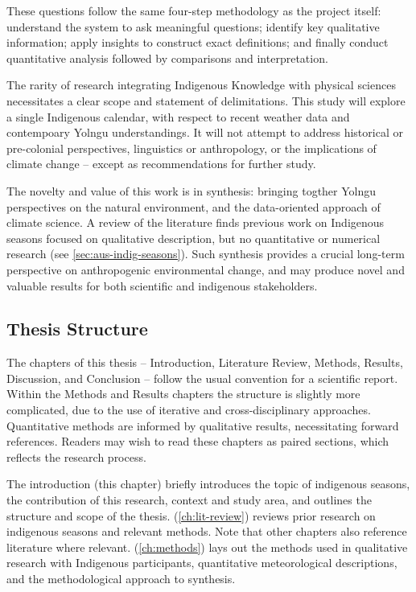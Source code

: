 These questions follow the same four-step methodology as the project itself:
understand the system to ask meaningful questions; identify key
qualitative information; apply insights to construct exact definitions; and
finally conduct quantitative analysis followed by comparisons and interpretation.

The rarity of research integrating Indigenous Knowledge with physical sciences
necessitates a clear scope and statement of delimitations.  This study will
explore a single Indigenous calendar, with respect to recent weather data
and contempoary Yolngu understandings.  It will not attempt to address historical
or pre-colonial perspectives, linguistics or anthropology, or the implications
of climate change -- except as recommendations for further study.

The novelty and value of this work is in synthesis: bringing
togther Yolngu perspectives on the natural environment, and the
data-oriented approach of climate science.  A review of the literature
finds previous work on Indigenous seasons focused on qualitative description, but
no quantitative or numerical research (see \cref{sec:aus-indig-seasons}).
Such synthesis provides a crucial long-term perspective on
anthropogenic environmental change, and may produce novel and valuable
results for both scientific and indigenous stakeholders.



\subsection*{Thesis Structure}

The chapters of this thesis -- Introduction, Literature Review, Methods,
Results, Discussion, and Conclusion -- follow the usual convention for
a scientific report.  Within the Methods and Results chapters
the structure is slightly more complicated, due to the use of iterative and
cross-disciplinary approaches.  Quantitative methods are informed by
qualitative results, necessitating forward references.  Readers may wish
to read these chapters as paired sections, which reflects the research
process.

The introduction (this chapter) briefly introduces the topic of
indigenous seasons, the contribution of this research, context and
study area, and outlines the structure and scope of the thesis.
 (\cref{ch:lit-review}) reviews prior research
on indigenous seasons and relevant methods.  Note that other chapters
also reference literature where relevant.
 (\cref{ch:methods}) lays out the methods used in
qualitative research with Indigenous participants, quantitative meteorological
descriptions, and the methodological approach to synthesis.

